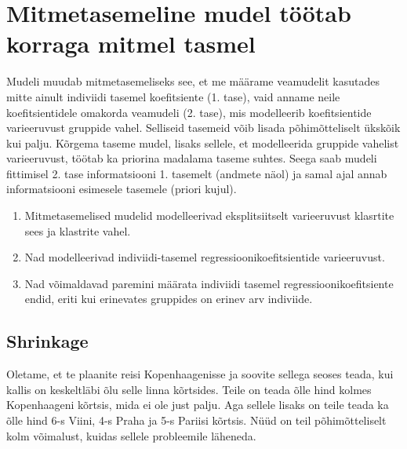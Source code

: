 \documentclass[]{book}
\begin{document}
\section{Mitmetasemeline mudel töötab korraga mitmel
tasmel}\label{mitmetasemeline-mudel-tootab-korraga-mitmel-tasmel}

Mudeli muudab mitmetasemeliseks see, et me määrame veamudelit kasutades
mitte ainult indiviidi tasemel koefitsiente (1. tase), vaid anname neile
koefitsientidele omakorda veamudeli (2. tase), mis modelleerib
koefitsientide varieeruvust gruppide vahel. Selliseid tasemeid võib
lisada põhimõtteliselt ükskõik kui palju. Kõrgema taseme mudel, lisaks
sellele, et modelleerida gruppide vahelist varieeruvust, töötab ka
priorina madalama taseme suhtes. Seega saab mudeli fittimisel 2. tase
informatsiooni 1. tasemelt (andmete näol) ja samal ajal annab
informatsiooni esimesele tasemele (priori kujul).

\begin{enumerate}
\def\labelenumi{\arabic{enumi}.}
\item
  Mitmetasemelised mudelid modelleerivad eksplitsiitselt varieeruvust
  klasrtite sees ja klastrite vahel.
\item
  Nad modelleerivad indiviidi-tasemel regressioonikoefitsientide
  varieeruvust.
\item
  Nad võimaldavad paremini määrata indiviidi tasemel
  regressioonikoefitsiente endid, eriti kui erinevates gruppides on
  erinev arv indiviide.
\end{enumerate}

\subsection*{Shrinkage}\label{shrinkage}

Oletame, et te plaanite reisi Kopenhaagenisse ja soovite sellega seoses
teada, kui kallis on keskeltläbi õlu selle linna kõrtsides. Teile on
teada õlle hind kolmes Kopenhaageni kõrtsis, mida ei ole just palju. Aga
sellele lisaks on teile teada ka õlle hind 6-s Viini, 4-s Praha ja 5-s
Pariisi kõrtsis. Nüüd on teil põhimõtteliselt kolm võimalust, kuidas
sellele probleemile läheneda.
\end{document}
